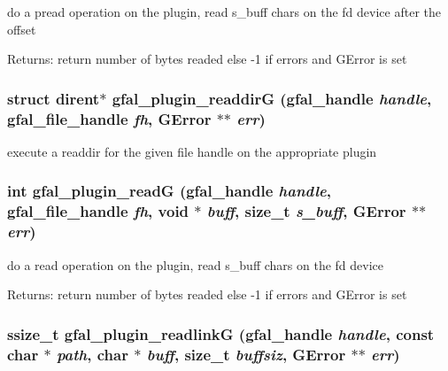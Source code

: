 do a pread operation on the plugin, read s\_\-buff chars on the fd device after the offset \begin{Desc}
\item[Returns:]return number of bytes readed else -1 if errors and GError is set \end{Desc}
\subsubsection{\setlength{\rightskip}{0pt plus 5cm}struct dirent$\ast$ gfal\_\-plugin\_\-readdir\-G (gfal\_\-handle {\em handle}, gfal\_\-file\_\-handle {\em fh}, GError $\ast$$\ast$ {\em err})}\label{gfal__common__plugin_8h_7fd9e55c89de0f0a85127972cecffcfd}


execute a readdir for the given file handle on the appropriate plugin 
\subsubsection{\setlength{\rightskip}{0pt plus 5cm}int gfal\_\-plugin\_\-read\-G (gfal\_\-handle {\em handle}, gfal\_\-file\_\-handle {\em fh}, void $\ast$ {\em buff}, size\_\-t {\em s\_\-buff}, GError $\ast$$\ast$ {\em err})}\label{gfal__common__plugin_8h_d536879bc7813a35bc79318ce43f0b57}


do a read operation on the plugin, read s\_\-buff chars on the fd device \begin{Desc}
\item[Returns:]return number of bytes readed else -1 if errors and GError is set \end{Desc}
\subsubsection{\setlength{\rightskip}{0pt plus 5cm}ssize\_\-t gfal\_\-plugin\_\-readlink\-G (gfal\_\-handle {\em handle}, const char $\ast$ {\em path}, char $\ast$ {\em buff}, size\_\-t {\em buffsiz}, GError $\ast$$\ast$ {\em err})}\label{gfal__common__plugin_8h_d2e6e573b52926185793ff4f0dd5e307}



